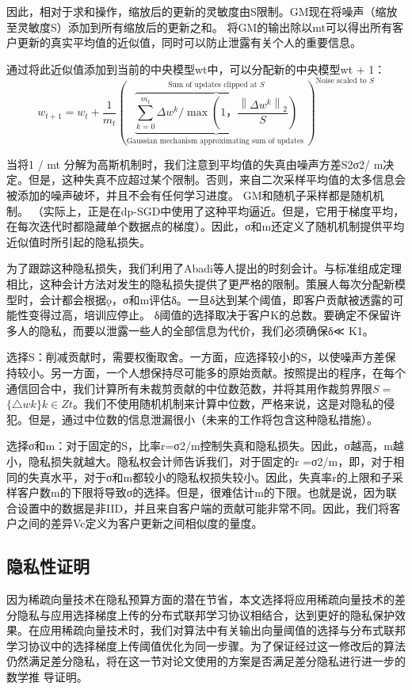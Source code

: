 因此，相对于求和操作，缩放后的更新的灵敏度由S限制。GM现在将噪声（缩放至灵敏度S）添加到所有缩放后的更新之和。 将GM的输出除以mt可以得出所有客户更新的真实平均值的近似值，同时可以防止泄露有关个人的重要信息。

通过将此近似值添加到当前的中央模型wt中，可以分配新的中央模型wt + 1：
\begin{equation}
w_{t+1}=w_{t}+\frac{1}{m_{t}}(\underbrace{\overbrace{\sum_{k=0}^{m_{t}} \Delta w^{k} / \max \left(1， \frac{\left\|\Delta w^{k}\right\|_{2}}{S}\right)}^{\text {Sum of updates clipped at } S}}_{\text {Gaussian mechanism approximating sum of updates }})^{\text {Noise scaled to } S}
\end{equation}


当将1 / mt 分解为高斯机制时，我们注意到平均值的失真由噪声方差S2σ2/ m决定。但是，这种失真不应超过某个限制。否则，来自二次采样平均值的太多信息会被添加的噪声破坏，并且不会有任何学习进度。 GM和随机子采样都是随机机制。 （实际上，正是在dp-SGD中使用了这种平均逼近。但是，它用于梯度平均，在每次迭代时都隐藏单个数据点的梯度）。因此，σ和m还定义了随机机制提供平均近似值时所引起的隐私损失。

为了跟踪这种隐私损失，我们利用了Abadi等人提出的时刻会计。与标准组成定理相比，这种会计方法对发生的隐私损失提供了更严格的限制。策展人每次分配新模型时，会计都会根据ǫ，σ和m评估δ。一旦δ达到某个阈值，即客户贡献被透露的可能性变得过高，培训应停止。 δ阈值的选择取决于客户K的总数。要确定不保留许多人的隐私，而要以泄露一些人的全部信息为代价，我们必须确保δ≪ K1。

选择S：削减贡献时，需要权衡取舍。一方面，应选择较小的S，以使噪声方差保持较小。另一方面，一个人想保持尽可能多的原始贡献。按照提出的程序，在每个通信回合中，我们计算所有未裁剪贡献的中位数范数，并将其用作裁剪界限$S=$ $\{\triangle w k\} k \in Z t$。我们不使用随机机制来计算中位数，严格来说，这是对隐私的侵犯。但是，通过中位数的信息泄漏很小（未来的工作将包含这种隐私措施）。

选择σ和m：对于固定的S，比率r=σ2/m控制失真和隐私损失。因此，σ越高，m越小，隐私损失就越大。隐私权会计师告诉我们，对于固定的r =σ2/m，即，对于相同的失真水平，对于σ和m都较小的隐私权损失较小。因此，失真率r的上限和子采样客户数m的下限将导致σ的选择。但是，很难估计m的下限。也就是说，因为联合设置中的数据是非IID，并且来自客户端的贡献可能非常不同。因此，我们将客户之间的差异Vc定义为客户更新之间相似度的量度。

\subsection{隐私性证明}
因为稀疏向量技术在隐私预算方面的潜在节省，本文选择将应用稀疏向量技术的差分隐私与应用选择梯度上传的分布式联邦学习协议相结合，达到更好的隐私保护效果。在应用稀疏向量技术时，我们对算法中有关输出向量阈值的选择与分布式联邦学习协议中的选择梯度上传阈值优化为同一步骤。为了保证经过这一修改后的算法仍然满足差分隐私，将在这一节对论文使用的方案是否满足差分隐私进行进一步的数学推
导证明。 

